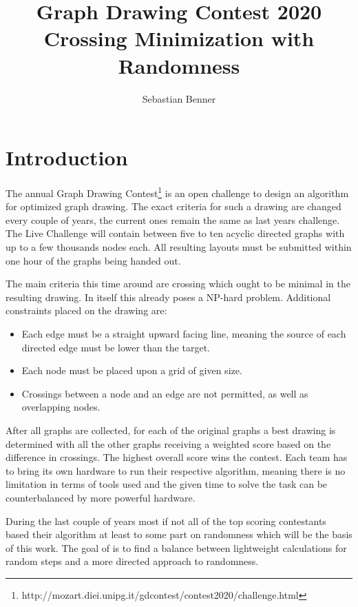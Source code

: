 \documentclass[]{llncs}
\begin{document}
    \title{Graph Drawing Contest 2020 \\
           Crossing Minimization with Randomness}
    \author{Sebastian Benner}
    \maketitle
    

    \section{Introduction} 

	The annual Graph Drawing Contest\footnote{http://mozart.diei.unipg.it/gdcontest/contest2020/challenge.html} is an open challenge to design an algorithm for optimized graph drawing. The exact criteria for such a drawing are changed every couple of years, the current ones remain the same as last years challenge. The Live Challenge will contain between five to ten acyclic directed graphs with up to a few thousands nodes each. All resulting layouts must be submitted within one hour of the graphs being handed out.

The main criteria this time around are crossing which ought to be minimal in the resulting drawing. In itself this already poses a NP-hard problem. Additional constraints placed on the drawing are:
\begin{itemize}
	\item Each edge must be a straight upward facing line, meaning the source of each directed edge must be lower than the target.
	\item Each node must be placed upon a grid of given size.
	\item Crossings between a node and an edge are not permitted, as well as overlapping nodes.
\end{itemize}

After all graphs are collected, for each of the original graphs a best drawing is determined with all the other graphs receiving a weighted score based on the difference in crossings. The highest overall score wins the contest. Each team has to bring its own hardware to run their respective algorithm, meaning there is no limitation in terms of tools used and the given time to solve the task can be counterbalanced by more powerful hardware.

During the last couple of years most if not all of the top scoring contestants based their algorithm at least to some part on randomness which will be the basis of this work. The goal of is to find a balance between lightweight calculations for random steps and a more directed approach to randomness.
\end{document}

